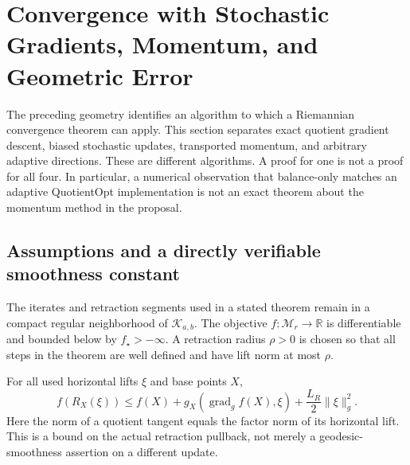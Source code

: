 \section{Convergence with Stochastic Gradients, Momentum, and Geometric Error}
\label{app:convergence}

The preceding geometry identifies an algorithm to which a Riemannian
convergence theorem can apply. This section separates exact quotient gradient
descent, biased stochastic updates, transported momentum, and arbitrary
adaptive directions. These are different algorithms. A proof for one is not
a proof for all four. In particular, a numerical observation that balance-only
matches an adaptive QuotientOpt implementation is not an exact theorem about
the momentum method in the proposal.

\subsection{Assumptions and a directly verifiable smoothness constant}
\begin{assumption}
\label{ass:regular}
The iterates and retraction segments used in a stated theorem remain in a
compact regular neighborhood of $\mathcal K_{a,b}$. The objective
$f:\mathcal M_r\to\mathbb R$ is differentiable and bounded below by
$f_\star> -\infty$. A retraction radius $\rho>0$ is chosen so that all
steps in the theorem are well defined and have lift norm at most $\rho$.
\end{assumption}

\begin{assumption}
\label{ass:retraction-smooth}
For all used horizontal lifts $\xi$ and base points $X$,
\begin{equation}
 f(R_X(\xi))\leq f(X)+g_X(\operatorname{grad}_g f(X),\xi)
                   +\frac{L_R}{2}\|\xi\|_g^2.
 \label{eq:retraction-smooth}
\end{equation}
Here the norm of a quotient tangent equals the factor norm of its horizontal
lift. This is a bound on the actual retraction pullback, not merely a
geodesic-smoothness assertion on a different update.
\end{assumption}

